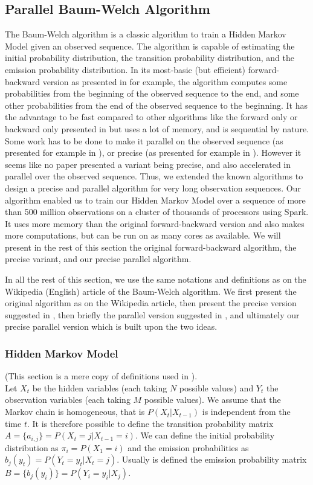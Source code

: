 \subsection{Parallel Baum-Welch Algorithm}
The Baum-Welch algorithm is a classic algorithm to train a Hidden Markov Model given an observed sequence. The algorithm is capable of estimating the initial probability distribution, the transition probability distribution, and the emission probability distribution.
In its most-basic (but efficient) forward-backward version as presented in \cite{rabiner1989tutorial} for example, the algorithm computes some probabilities from the beginning of the observed sequence to the end, and some other probabilities from the end of the observed sequence to the beginning. It has the advantage to be fast compared to other algorithms like the forward only or backward only presented in \cite{turin1998unidirectional} but uses a lot of memory, and is sequential by nature.
Some work has to be done to make it parallel on the observed sequence (as presented for example in \cite{turin1998unidirectional}), or precise (as presented for example in \cite{rabiner1989tutorial}). However it seems like no paper presented a variant being precise, and also accelerated in parallel over the observed sequence.
Thus, we extended the known algorithms to design a precise and parallel algorithm for very long observation sequences.
Our algorithm enabled us to train our Hidden Markov Model over a sequence of more than 500 million observations on a cluster of thousands of processors using Spark. It uses more memory than the original forward-backward version and also makes more computations, but can be run on as many cores as available.
We will present in the rest of this section the original forward-backward algorithm, the precise variant, and our precise parallel algorithm.

In all the rest of this section, we use the same notations and definitions as on the Wikipedia (English) article of the Baum-Welch algorithm. We first present the original algorithm as on the Wikipedia article, then present the precise version suggested in \cite{rabiner1989tutorial}, then briefly the parallel version suggested in \cite{turin1998unidirectional}, and ultimately our precise parallel version which is built upon the two ideas.

\subsubsection*{Hidden Markov Model}
(This section is a mere copy of definitions used in \cite{wiki:BaumWelch_algorithm}). \\
Let $X_t$ be the hidden variables (each taking $N$ possible values) and $Y_t$ the observation variables (each taking $M$ possible values). We assume that the Markov chain is homogeneous, that is $P(X_t|X_{t-1})$ is independent from the time $t$.
It is therefore possible to define the transition probability matrix $A = \{a_{i,j}\} = P(X_t = j | X_{t-1} = i)$.
We can define the initial probability distribution as $\pi_i = P(X_1=i)$ and the emission probabilities as $b_j(y_t) = P(Y_t = y_t | X_t = j)$. Usually is defined the emission probability matrix $B = \{b_j(y_i)\} = P(Y_i=y_i | X_j)$.

